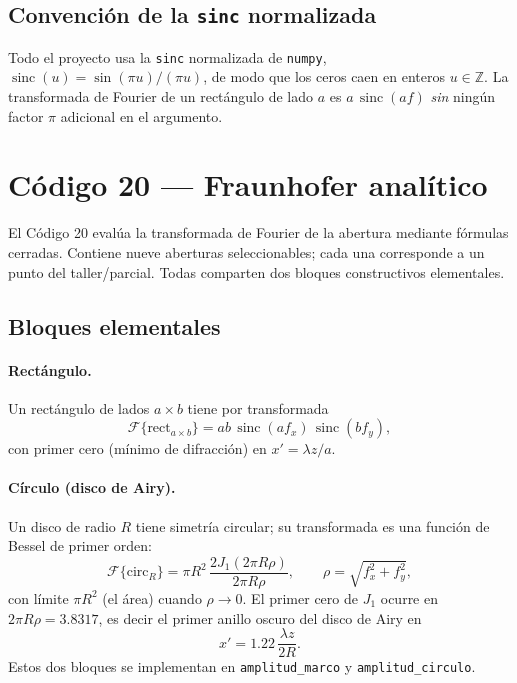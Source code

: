 \documentclass[11pt,a4paper]{article}
\newcommand{\sinc}{\operatorname{sinc}}
\newcommand{\Fou}{\mathcal{F}}
\begin{document}
\subsection{Convención de la \texttt{sinc} normalizada}
Todo el proyecto usa la \texttt{sinc} normalizada de \texttt{numpy},
$\sinc(u)=\sin(\pi u)/(\pi u)$, de modo que los ceros caen en enteros $u\in\mathbb{Z}$.
La transformada de Fourier de un rectángulo de lado $a$ es $a\,\sinc(a f)$
\emph{sin} ningún factor $\pi$ adicional en el argumento.

\section{Código 20 --- Fraunhofer analítico}

El Código 20 evalúa la transformada de Fourier de la abertura mediante fórmulas
cerradas. Contiene nueve aberturas seleccionables; cada una corresponde a un punto
del taller/parcial. Todas comparten dos bloques constructivos elementales.

\subsection{Bloques elementales}
\paragraph{Rectángulo.} Un rectángulo de lados $a\times b$ tiene por transformada
\begin{equation}
\Fou\{\text{rect}_{a\times b}\} = ab\,\sinc(a f_x)\,\sinc(b f_y),
\end{equation}
con primer cero (mínimo de difracción) en $x' = \lambda z/a$.

\paragraph{Círculo (disco de Airy).} Un disco de radio $R$ tiene simetría
circular; su transformada es una función de Bessel de primer orden:
\begin{equation}
\Fou\{\text{circ}_R\} = \pi R^2\,\frac{2 J_1(2\pi R\rho)}{2\pi R\rho},
\qquad \rho=\sqrt{f_x^2+f_y^2},
\end{equation}
con límite $\pi R^2$ (el área) cuando $\rho\to 0$. El primer cero de $J_1$ ocurre
en $2\pi R\rho = 3.8317$, es decir el primer anillo oscuro del disco de Airy en
\begin{equation}
x' = 1.22\,\frac{\lambda z}{2R}.
\end{equation}
Estos dos bloques se implementan en \texttt{amplitud\_marco} y
\texttt{amplitud\_circulo}.
\end{document}
